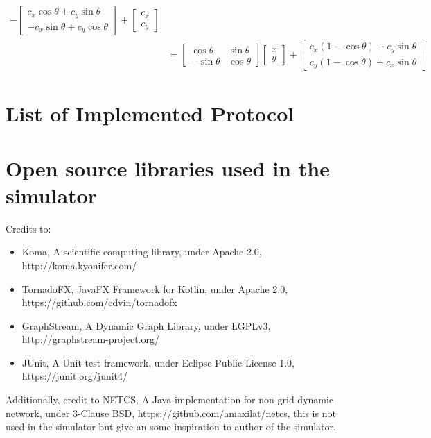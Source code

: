 \begin{equation*}
\begin{split}
          - \begin{bmatrix} c_{x}\cos\theta + c_{y}\sin\theta \\ -c_{x}\sin\theta + c_{y}\cos\theta \end{bmatrix} +
           \begin{bmatrix} c_{x} \\ c_{y} \end{bmatrix} \\
          &= \begin{bmatrix} \cos\theta & \sin\theta \\ -\sin\theta & \cos\theta \end{bmatrix} \begin{bmatrix} x \\ y \end{bmatrix}
          + \begin{bmatrix} c_{x}(1 - \cos\theta) - c_{y}\sin\theta \\ c_{y}(1 - \cos\theta) + c_{x}\sin\theta \end{bmatrix}
\end{split}
\end{equation*}

\section{List of Implemented Protocol}

\section{Open source libraries used in the simulator}
Credits to:
\begin{itemize}
  \item Koma, A scientific computing library, under Apache 2.0, http://koma.kyonifer.com/
  \item TornadoFX, JavaFX Framework for Kotlin, under Apache 2.0, https://github.com/edvin/tornadofx
  \item GraphStream, A Dynamic Graph Library, under LGPLv3, http://graphstream-project.org/
  \item JUnit, A Unit test framework, under Eclipse Public License 1.0, https://junit.org/junit4/
\end{itemize}
Additionally, credit to NETCS, A Java implementation for non-grid dynamic network, under 3-Clause BSD, https://github.com/amaxilat/netcs,
this is not used in the simulator but give an some inspiration to author of the simulator.
